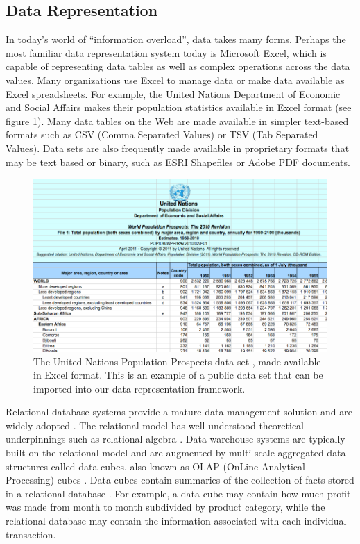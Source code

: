 \subsection{Data Representation}
In today's world of ``information overload'', data takes many forms. Perhaps the most familiar data representation system today is Microsoft Excel, which is capable of representing data tables as well as complex operations across the data values. Many organizations use Excel to manage data or make data available as Excel spreadsheets. For example, the United Nations Department of Economic and Social Affairs makes their population statistics available in Excel format (see figure \ref{fig:unPopExcel}). Many data tables on the Web are made available in simpler text-based formats such as CSV (Comma Separated Values) or TSV (Tab Separated Values). Data sets are also frequently made available in proprietary formats that may be text based or binary, such as ESRI Shapefiles or Adobe PDF documents.

\begin{figure}[h!]
  \centering
  \includegraphics[width=\textwidth]{figures/UN_World_Population_Spreadsheet.png}
  \caption[United Nations population estimates spreadsheet.]
   {The United Nations Population Prospects data set \cite{unPopData}, made available in Excel format. This is an example of a public data set that can be imported into our data representation framework.}
  \label{fig:unPopExcel}
\end{figure}

Relational database systems provide a mature data management solution and are widely adopted \cite{ramakrishnan2000database}. The relational model has well understood theoretical underpinnings such as relational algebra \cite{clifford1985algebra}. Data warehouse systems are typically built on the relational model and are augmented by multi-scale aggregated data structures called data cubes, also known as OLAP (OnLine Analytical Processing) cubes \cite{gray1997data, codd1993providing}. Data cubes contain summaries of the collection of facts stored in a relational database \cite{chaudhuri1997overview}. For example, a data cube may contain how much profit was made from month to month subdivided by product category, while the relational database may contain the information associated with each individual transaction.

